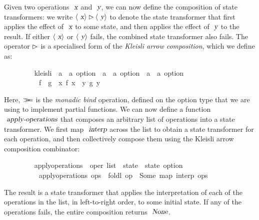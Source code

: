 Given two operations $\isa{x}$ and $\isa{y}$, we can now define the composition of state transformers: we write $\langle\isa{x}\rangle \mathbin{\isasymrhd} \langle\isa{y}\rangle$ to denote the state transformer that first applies the effect of $\isa{x}$ to some state, and then applies the effect of $\isa{y}$ to the result.
If either $\langle\isa{x}\rangle$ or $\langle\isa{y}\rangle$ fails, the combined state transformer also fails.
The operator $\emph{$\rhd$}$ is a specialised form of the \emph{Kleisli arrow composition}, which we define as:
\vspace{0.35em}
\begin{isabellebody}
\ \ \ \ \ \ \ \  kleisli\ {\isacharcolon}{\isacharcolon}\ {\isachardoublequoteopen}{\isacharparenleft}{\isacharprime}a\ {\isasymRightarrow}\ {\isacharprime}a\ option{\isacharparenright}\ {\isasymRightarrow}\ {\isacharparenleft}{\isacharprime}a\ {\isasymRightarrow}\ {\isacharprime}a\ option{\isacharparenright}\ {\isasymRightarrow}\ {\isacharparenleft}{\isacharprime}a\ {\isasymRightarrow}\ {\isacharprime}a\ option{\isacharparenright}{\isachardoublequoteclose}\ \isanewline
\ \ \ \ \ \ \ \ \ \ {\isachardoublequoteopen}f\ {\isasymrhd}\ g\ {\isasymequiv}\ {\isasymlambda}x{\isachardot}\ f\ x\ {\isasymbind}\ {\isacharparenleft}{\isasymlambda}y{\isachardot}\ g\ y{\isacharparenright}{\isachardoublequoteclose}
\end{isabellebody}
\vspace{0.35em}
\noindent Here, $\emph{$\mathbin{>\!\!\!>\mkern-6.7mu=}$}$ is the \emph{monadic bind} operation, defined on the option type that we are using to implement partial functions.
We can now define a function $\isa{apply-operations}$ that composes an arbitrary list of operations into a state transformer.
We first map $\isa{interp}$ across the list to obtain a state transformer for each operation, and then collectively compose them using the Kleisli arrow composition combinator:
\vspace{0.35em}
\begin{isabellebody}
\ \ \ \ \ \ \ \  apply{\isacharunderscore}operations\ {\isacharcolon}{\isacharcolon}\ {\isachardoublequoteopen}{\isacharprime}oper\ list\ {\isasymRightarrow}\ {\isacharprime}state\ {\isasymRightarrow}\ {\isacharprime}state\ option{\isachardoublequoteclose}\ \isanewline
\ \ \ \ \ \ \ \ \ \ {\isachardoublequoteopen}apply{\isacharunderscore}operations\ ops\ {\isasymequiv}\ foldl\ {\isacharparenleft}op\ {\isasymrhd}{\isacharparenright}\ Some\ {\isacharparenleft}map\ interp\ ops{\isacharparenright}{\isachardoublequoteclose}
\end{isabellebody}
\vspace{0.35em}
\noindent The result is a state transformer that applies the interpretation of each of the operations in the list, in left-to-right order, to some initial state.
If any of the operations fails, the entire composition returns $\isa{None}$.


